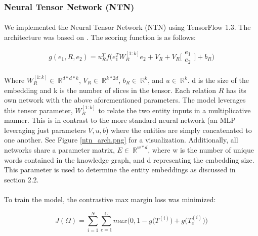\documentclass[11.5pt]{article}
\newcounter{Figure}
\newcommand{\R}{\ \mathbb{R}}
\begin{document}
\subsubsection{Neural Tensor Network (NTN)}
\paragraph{}  We implemented the Neural Tensor Network (NTN) using TensorFlow 1.3. The architecture was based on \cite{socher2013reasoning}. The scoring function is as follows:

\begin{equation}
g(e_1,R,e_2)  = u_R^Tf \bigg( e_1^TW_R^{[1:k]}e_2 + V_R + V_R 
\bigg[ \begin{matrix}  e_1 \\ e_2  \end{matrix} \bigg] + b_R \bigg)
\end{equation}

\paragraph{}  Where  $ W_R^{[1:k]} \in \R^ {d * d * k} $, $ V_R \in \R^ {k * 2d} $, $ b_R \in \R^ {k } $, and  $ u \in \R^ {k } $. d is the size of the embedding and k is the number of slices in the tensor. Each relation $R$ has its own network with the above aforementioned parameters. The model leverages this tensor parameter, $ W_R^{[1:k]} $ to relate the two entity inputs in a multiplicative manner. This is in contrast to the more standard neural network (an MLP leveraging just parameters $ V,u,b $) where the entities are simply concatenated to one another. See Figure \ref{ntn_arch.png} for a visualization. Additionally, all networks share a parameter matrix, $E \in \R^{w*d} $, where w is the number of unique words contained in the knowledge graph, and d representing the embedding size. This parameter is used to determine the entity embeddings as discussed in section 2.2.

\paragraph{}  To train the model, the contrastive max margin loss was minimized:


\begin{equation}
J(\Omega)  = \sum_{i=1}^{N} \sum_{c=1}^{C} max \bigg(0,1 - g\bigg( T^(i) \bigg) +  g\bigg( T_c^(i) \bigg)   \bigg)
\end{equation}
\end{document}
